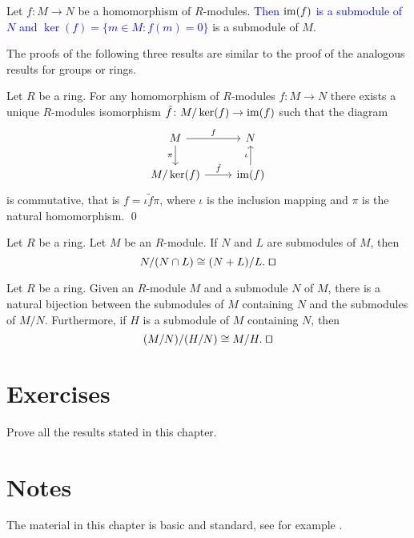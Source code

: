Let $f\colon M\rightarrow N$ be a homomorphism of $R$-modules. \textcolor{blue}{Then
$\operatorname{im}(f)$ is a submodule
of $N$ and $\ker(f)=\{m\in M:f(m)=0\}$} is a submodule of $M$.

The proofs of the following three results are similar 
to the proof of the analogous results for groups or rings. 
 
\begin{theorem}
Let $R$ be a ring.	For any homomorphism of $R$-modules $f\colon M\rightarrow N$ 
there exists a unique $R$-modules isomorphism $\tilde f\colon M/\ker(f)\rightarrow\operatorname{im}(f)$ such that the diagram
	\[\begin{tikzcd}
		{M} & {N} \\
		{M/\ker(f)} & {\im(f)}
		\arrow["f", from=1-1, to=1-2]
		\arrow["{\pi}"', from=1-1, to=2-1]
		\arrow["{\iota}", from=2-2, to=1-2]
		\arrow["{\tilde f}", from=2-1, to=2-2]
	\end{tikzcd}
	\]
	is commutative, that is $f=\iota\tilde f\pi$, 
 where $\iota$ is the inclusion mapping and $\pi$ is the natural homomorphism. \qed	
\end{theorem} 


\begin{theorem}
Let $R$ be a ring.	Let $M$ be an $R$-module. If $N$ and $L$ are submodules of $M$, then 
	$$N/(N\cap L)\cong (N+L)/L. \; \qed$$  
\end{theorem}

\begin{theorem} Let $R$ be a ring. Given an $R$-module $M$ and a submodule $N$ of $M$, there is a natural bijection between the submodules of $M$ containing $N$ and the submodules of $M/N$. 
Furthermore, if $H$ is a submodule of $M$ containing $N$, then
\[
(M/N)/(H/N)\cong M/H.\; \qed
\]
\end{theorem}



\section{Exercises}

\begin{prob} 
    Prove all the results stated in this chapter.
\end{prob}

\section{Notes}

The material in this chapter is basic and standard, see for example \cite{Cohn}.

